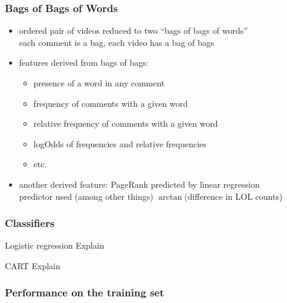 \documentclass[fleqn]{beamer}
\begin{document}
\begin{frame}
\frametitle{Bags of Bags of Words}
     \begin{itemize}
         \item ordered pair of videos reduced to two ``bags of bags of words''  \\
                  each comment is a bag, each video has a bag of bags

         \item features derived from bags of bags:
             \begin{itemize}
                 \item presence of a word in any comment
                 \item frequency of comments with a given word
                 \item relative frequency of comments with a given word
                 \item  logOdds of frequencies and relative frequencies
                 \item etc.
              \end{itemize}
         
         \item another derived feature: PageRank predicted by linear regression\\ 
                  predictor used (among other things) $\arctan$(difference in LOL counts)
     
     \end{itemize}
\end{frame}

\begin{frame}
\frametitle{Classifiers}

     \begin{beamerboxesrounded}{Logistic regression}
         Explain
     \end{beamerboxesrounded}
     
     \begin{beamerboxesrounded}{CART}
         Explain
      \end{beamerboxesrounded}

\end{frame}

\begin{frame}
\frametitle{Performance on the training set}

\end{frame}
\end{document}
